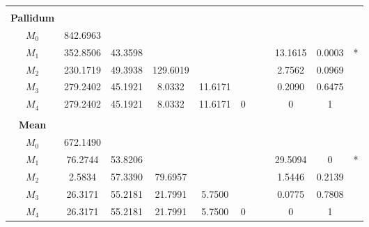 \documentclass[11pt]{article}
\begin{document}
\begin{table}[htbp]
{\begin{tabular}{ccccccccccc}
\hline
\rule{0pt}{3pt} \\  
\textbf{Pallidum} &  &  &  &  &  &  &  &  &  &  \\
$M_0$    & 842.6963 &  &  &  &  &  &  &  &  &  \\
$M_1$    & 352.8506 & 43.3598 &  &  &  &  &  & 13.1615 & 0.0003 & * \\
$M_2$    & 230.1719 & 49.3938 & 129.6019 &  &  &  &  & 2.7562  & 0.0969 &  \\
$M_3$     & 279.2402 & 45.1921 & 8.0332 & 11.6171 &  &  &  & 0.2090 & 0.6475 &  \\
$M_4$     & 279.2402 & 45.1921 & 8.0332 & 11.6171 & 0 &  &  & 0 & 1 &  \\

\hline
\rule{0pt}{3pt} \\  
\textbf{Mean} &  &  &  &  &  &  &  &  &  &  \\
$M_0$     & 672.1490 &  &  &  &  &  &  &  &  &  \\
$M_1$     & 76.2744 & 53.8206 &  &  &  &  &  & 29.5094 & 0& * \\
$M_2$     & 2.5834 & 57.3390 & 79.6957 &  &  &  &  & 1.5446 & 0.2139 &  \\
$M_3$     & 26.3171 & 55.2181 & 21.7991 & 5.7500 &  &  &  & 0.0775  & 0.7808 &  \\
$M_4$     & 26.3171 & 55.2181 & 21.7991 & 5.7500 & 0 &  &  & 0 & 1 &  \\

\bottomrule
\end{tabular}
}
\end{table}
\end{document}
